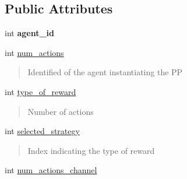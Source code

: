 \subsection*{Public Attributes}
\begin{DoxyCompactItemize}
\item 
\mbox{\label{classPreProcessor_a9375bc3b2f6304d96aa0423a63ad7efc}} 
int {\bfseries agent\+\_\+id}
\item 
\mbox{\label{classPreProcessor_a52fcb7d5b9ca9538faecf1f488cd751b}} 
int \hyperlink{classPreProcessor_a52fcb7d5b9ca9538faecf1f488cd751b}{num\+\_\+actions}
\begin{DoxyCompactList}\small\item\em \begin{quote}
Identified of the agent instantiating the PP \end{quote}
\end{DoxyCompactList}\item 
\mbox{\label{classPreProcessor_a6b837daa4f40e20f9d7bbdbd1b2ef1d2}} 
int \hyperlink{classPreProcessor_a6b837daa4f40e20f9d7bbdbd1b2ef1d2}{type\+\_\+of\+\_\+reward}
\begin{DoxyCompactList}\small\item\em \begin{quote}
Number of actions \end{quote}
\end{DoxyCompactList}\item 
\mbox{\label{classPreProcessor_a0202a8a49330622820f37961fb013506}} 
int \hyperlink{classPreProcessor_a0202a8a49330622820f37961fb013506}{selected\+\_\+strategy}
\begin{DoxyCompactList}\small\item\em \begin{quote}
Index indicating the type of reward \end{quote}
\end{DoxyCompactList}\item 
\mbox{\label{classPreProcessor_a6b101dc1a43b2164637d096384e6fcb6}} 
int \hyperlink{classPreProcessor_a6b101dc1a43b2164637d096384e6fcb6}{num\+\_\+actions\+\_\+channel}
\begin{DoxyCompactList}\small\item\em \begin{quote}

\end{quote}
\end{DoxyCompactList}
\end{DoxyCompactItemize}
